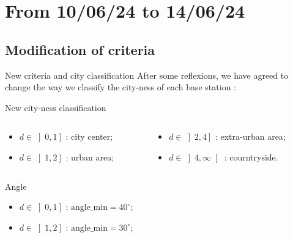 
\smallframetitle

\section{From 10/06/24 to 14/06/24}
\insertsectionframe

\subsection{Modification of criteria}
\insertsubsectionframe

\begin{frame}{New criteria and city classification}
    After some reflexions, we have agreed to change the way we classify the city-ness of each base station :
    \begin{block}{New city-ness classification}
        \begin{columns}
            \begin{column}{0.4\paperwidth}
                \begin{itemize}
                    \item $d\in\left]0, 1\right]$ : city center;
                    \item $d\in\left]1, 2\right]$ : urban area;
                \end{itemize}
            \end{column}
            \begin{column}{0.4\paperwidth}
                \begin{itemize}
                    \item $d\in\left]2, 4\right]$ : extra-urban area;
                    \item $d\in\left]4, \infty\right[$ : courntryside.
                \end{itemize}
            \end{column}
        \end{columns}
    \end{block}
    \begin{columns}
        \begin{column}{0.4\paperwidth}
            \begin{block}{Angle}
                \begin{itemize}
                    \item $d\in\left]0, 1\right]$ : $\text{angle\_min}=40^\circ$;
                    \item $d\in\left]1, 2\right]$ : $\text{angle\_min}=30^\circ$;

\end{itemize}
\end{block}
\end{column}
\end{columns}
\end{frame}
